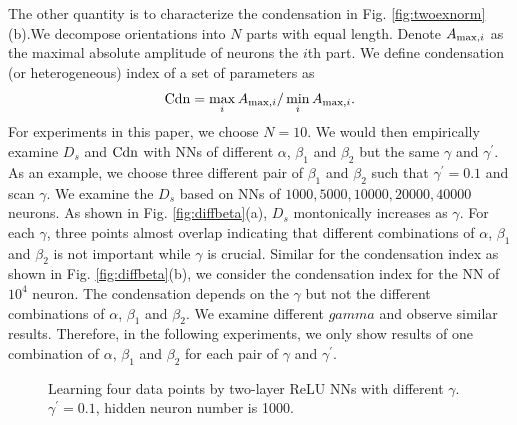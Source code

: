 \documentclass{article}
\begin{document}
The other quantity is to characterize the condensation in Fig. \ref{fig:twoexnorm} (b).We decompose orientations into $N$ parts with equal length. Denote $A_{{\rm max},i}$ as the maximal absolute amplitude of neurons the $i$th part. We define condensation (or heterogeneous) index of a set of parameters as
\begin{equation}
    {\rm Cdn}=\max_{i} A_{{\rm max},i} / \min_{i} A_{{\rm max},i}.
\end{equation}
For experiments in this paper, we choose $N=10$. We would then empirically examine $D_{s}$ and ${\rm Cdn}$ with  NNs of  different  $\alpha$, $\beta_1$ and $\beta_2$ but  the same $\gamma$ and $\gamma^{\prime}$. As an example, we choose three different pair of $\beta_1$ and $\beta_2$ such that  $\gamma^{\prime}=0.1$ and scan  $\gamma$. We examine the $D_s$ based on NNs of $1000,5000,10000,20000,40000$ neurons. As shown in Fig. \ref{fig:diffbeta}(a), $D_s$ montonically increases as $\gamma$. For each $\gamma$, three points almost overlap indicating that different combinations of  $\alpha$, $\beta_1$ and $\beta_2$ is not important while $\gamma$ is crucial. Similar for the condensation index as shown in Fig. \ref{fig:diffbeta}(b), we consider the condensation index for the NN of $10^4$ neuron. The condensation depends on the $\gamma$ but not the different combinations of  $\alpha$, $\beta_1$ and $\beta_2$. We examine different $gamma$ and observe similar results. Therefore, in the following experiments, we only show results of one combination of $\alpha$, $\beta_1$ and $\beta_2$  for each pair of $\gamma$ and $\gamma^{\prime}$.

\begin{figure}
    \begin{centering}
        \par\end{centering}
    \caption{Learning four data points by two-layer ReLU NNs with different $\gamma$. $\gamma^{\prime}=0.1$, hidden neuron number is 1000.\label{fig:targetfunc} }
\end{figure}
\end{document}
